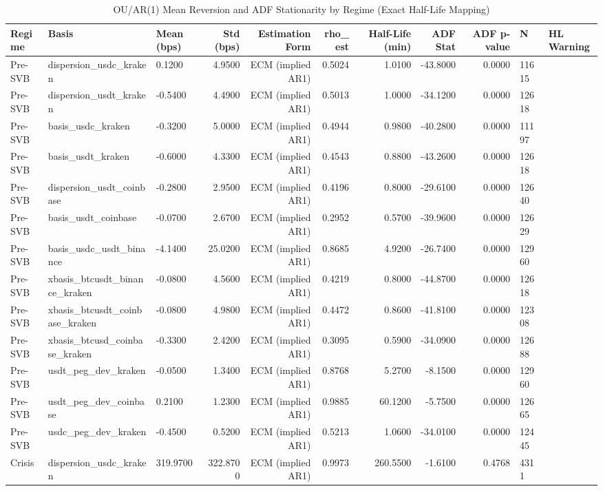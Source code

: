\begin{table}[H]
\caption{OU/AR(1) Mean Reversion and ADF Stationarity by Regime (Exact Half-Life Mapping)}
\label{tab:ou_stats}
\begin{tabular}{lllrrrrrrl}
\toprule
Regime & Basis & Mean (bps) & Std (bps) & Estimation Form & rho\_est & Half-Life (min) & ADF Stat & ADF p-value & N & HL Warning \\
\midrule
Pre-SVB & dispersion\_usdc\_kraken & 0.1200 & 4.9500 & ECM (implied AR1) & 0.5024 & 1.0100 & -43.8000 & 0.0000 & 11615 &  \\
Pre-SVB & dispersion\_usdt\_kraken & -0.5400 & 4.4900 & ECM (implied AR1) & 0.5013 & 1.0000 & -34.1200 & 0.0000 & 12618 &  \\
Pre-SVB & basis\_usdc\_kraken & -0.3200 & 5.0000 & ECM (implied AR1) & 0.4944 & 0.9800 & -40.2800 & 0.0000 & 11197 &  \\
Pre-SVB & basis\_usdt\_kraken & -0.6000 & 4.3300 & ECM (implied AR1) & 0.4543 & 0.8800 & -43.2600 & 0.0000 & 12618 &  \\
Pre-SVB & dispersion\_usdt\_coinbase & -0.2800 & 2.9500 & ECM (implied AR1) & 0.4196 & 0.8000 & -29.6100 & 0.0000 & 12640 &  \\
Pre-SVB & basis\_usdt\_coinbase & -0.0700 & 2.6700 & ECM (implied AR1) & 0.2952 & 0.5700 & -39.9600 & 0.0000 & 12629 &  \\
Pre-SVB & basis\_usdc\_usdt\_binance & -4.1400 & 25.0200 & ECM (implied AR1) & 0.8685 & 4.9200 & -26.7400 & 0.0000 & 12960 &  \\
Pre-SVB & xbasis\_btcusdt\_binance\_kraken & -0.0800 & 4.5600 & ECM (implied AR1) & 0.4219 & 0.8000 & -44.8700 & 0.0000 & 12618 &  \\
Pre-SVB & xbasis\_btcusdt\_coinbase\_kraken & -0.0800 & 4.9800 & ECM (implied AR1) & 0.4472 & 0.8600 & -41.8100 & 0.0000 & 12308 &  \\
Pre-SVB & xbasis\_btcusd\_coinbase\_kraken & -0.3300 & 2.4200 & ECM (implied AR1) & 0.3095 & 0.5900 & -34.0900 & 0.0000 & 12688 &  \\
Pre-SVB & usdt\_peg\_dev\_kraken & -0.0500 & 1.3400 & ECM (implied AR1) & 0.8768 & 5.2700 & -8.1500 & 0.0000 & 12960 &  \\
Pre-SVB & usdt\_peg\_dev\_coinbase & 0.2100 & 1.2300 & ECM (implied AR1) & 0.9885 & 60.1200 & -5.7500 & 0.0000 & 12665 &  \\
Pre-SVB & usdc\_peg\_dev\_kraken & -0.4500 & 0.5200 & ECM (implied AR1) & 0.5213 & 1.0600 & -34.0100 & 0.0000 & 12445 &  \\
Crisis & dispersion\_usdc\_kraken & 319.9700 & 322.8700 & ECM (implied AR1) & 0.9973 & 260.5500 & -1.6100 & 0.4768 & 4311 &  \\

\end{tabular}
\end{table}
